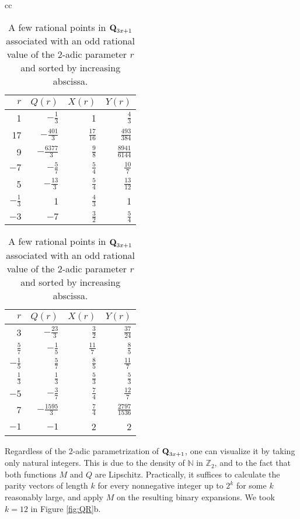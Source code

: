 \documentclass[12pt]{article}
\theoremstyle{definition}
\newcommand{\Qset}{\normalfont \textbf{Q}_{3x+1}}
\begin{document}
{{\renewcommand{\arraystretch}{1.5}
\begin{table}
\caption{A few rational points in $\Qset$ associated with an odd rational value of the 2-adic parameter $r$ and sorted by increasing abscissa.}
\label{tab:points}
\begin{center}
\begin{tabular}{cc}

\begin{tabular}{|r|r|r|r|}
\hline
$r$ & $Q(r)$ & $X(r)$ & $Y(r)$ \\
\hline
\hline
1 & $-\frac{1}{3}$ & 1 & $\frac{4}{3}$ \\
\hline
17 & $-\frac{401}{3}$ & $\frac{17}{16}$ & $\frac{493}{384}$ \\
\hline
9 & $-\frac{6377}{3}$ & $ \frac{9}{8} $ & $ \frac{8941}{6144} $ \\
\hline
$-7$ & $ -\frac{5}{7} $ & $ \frac{5}{4} $ & $ \frac{10}{7} $ \\
\hline
5 & $ -\frac{13}{3} $ & $ \frac{5}{4} $ & $ \frac{13}{12} $ \\
\hline
$ -\frac{1}{3} $ & 1 & $ \frac{4}{3} $ & 1 \\
\hline
$-3$ & $-7$ & $ \frac{3}{2} $ & $ \frac{5}{4} $ \\
\hline
\end{tabular}

\begin{tabular}{|r|r|r|r|}
\hline
$r$ & $Q(r)$ & $X(r)$ & $Y(r)$ \\
\hline
\hline
3 & $ -\frac{23}{3} $ & $ \frac{3}{2} $ & $ \frac{37}{24} $ \\
\hline
$ \frac{5}{7} $ & $ -\frac{1}{5} $ & $ \frac{11}{7} $ & $ \frac{8}{5} $ \\
\hline
$ -\frac{1}{5} $ & $ \frac{5}{7} $ & $ \frac{8}{5} $ & $ \frac{11}{7} $ \\
\hline
$ \frac{1}{3} $ & $ \frac{1}{3} $ & $ \frac{5}{3} $ & $ \frac{5}{3} $ \\
\hline
$-5$ & $ -\frac{3}{7} $ & $ \frac{7}{4} $ & $ \frac{12}{7} $ \\
\hline
7 & $ -\frac{1595}{3} $ & $ \frac{7}{4} $ & $ \frac{2797}{1536} $ \\
\hline
$-1$ & $-1$ & 2 & 2 \\
\hline
\end{tabular}
\end{tabular}
\end{center}
\end{table}

Regardless of the 2-adic parametrization of $\Qset$, one can visualize it by taking only natural integers. This is due to the density of $\mathbb N$ in $\mathbb Z_2$, and to the fact that both functions $M$ and $Q$ are Lipschitz.  Practically, it suffices to calculate the parity vectors of length $k$ for every nonnegative integer up to $2^k$ for some $k$ reasonably large, and apply $M$ on the resulting binary expansions. We took $k=12$ in Figure \ref{fig:QR}b.

}}
\end{document}
